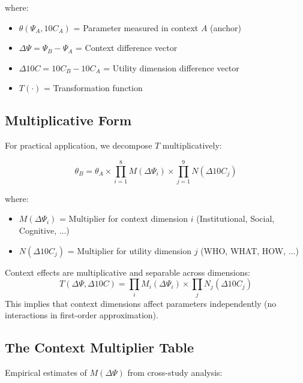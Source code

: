 where:
\begin{itemize}
    \item $\theta(\Psi_A, 10C_A)$ = Parameter measured in context $A$ (anchor)
    \item $\Delta\Psi = \Psi_B - \Psi_A$ = Context difference vector
    \item $\Delta 10C = 10C_B - 10C_A$ = Utility dimension difference vector
    \item $T(\cdot)$ = Transformation function
\end{itemize}

\subsection{Multiplicative Form}

For practical application, we decompose $T$ multiplicatively:

\begin{equation}
\theta_B = \theta_A \times \prod_{i=1}^{8} M(\Delta\Psi_i) \times \prod_{j=1}^{9} N(\Delta 10C_j)
\label{eq:pct-multiplicative}
\end{equation}

where:
\begin{itemize}
    \item $M(\Delta\Psi_i)$ = Multiplier for context dimension $i$ (Institutional, Social, Cognitive, ...)
    \item $N(\Delta 10C_j)$ = Multiplier for utility dimension $j$ (WHO, WHAT, HOW, ...)
\end{itemize}

\begin{axiom}
\label{ax:pct-2}
Context effects are multiplicative and separable across dimensions:
\[
T(\Delta\Psi, \Delta 10C) = \prod_i M_i(\Delta\Psi_i) \times \prod_j N_j(\Delta 10C_j)
\]
This implies that context dimensions affect parameters independently (no interactions
in first-order approximation).
\end{axiom}

\subsection{The Context Multiplier Table}

Empirical estimates of $M(\Delta\Psi)$ from cross-study analysis:

